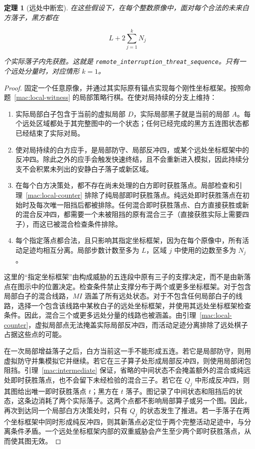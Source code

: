 \documentclass[11pt]{article}
\newtheorem{theorem}{定理}[section]
\theoremstyle{definition}
\theoremstyle{remark}
\begin{document}
\begin{theorem}[远处中断宏]\label{mac:interruption}
在这些假设下，在每个整数原像中，面对每个合法的未来白方落子，黑方都在

\[
 L+2\sum_{j=1}^kN_j
\]

个实际落子内先获胜。这就是 \texttt{remote\_interruption\_threat\_sequence}。只有一个远处分量时，对应情形 \(k=1\)。

\end{theorem}
\begin{proof}
固定一个任意原像，并通过其实际原有锚点实现每个刚性坐标框架。按照命题~\ref{mac:local-witness} 的局部策略行棋。在使对局持续的分支上维持：

\begin{enumerate}
\item 实际局部白子包含于当前的虚拟局部 \(D\)，实际局部黑子就是当前的局部 \(A\)。每个远处区域都处于其完整图中的一个状态；任何已经完成的黑方五连图状态都已经结束了实际对局。
\item 使对局持续的白方应手，是局部防守、局部反冲四，或某个远处坐标框架中的反冲四。除此之外的应手会触发快速终结，且不会重新进入模拟，因此持续分支不会积累未列出的安静白子落子或新区域。
\item 在每个白方决策处，都不存在尚未处理的白方即时获胜落点。局部检查和引理~\ref{mac:local-counter} 排除了纯局部即时获胜落点。纯远处即时获胜落点在初始时及每次唯一阻挡后都被排除。任何混合即时获胜落点、白方直接获胜或新的混合反冲四，都需要一个未被阻挡的原有混合三子（直接获胜实际上需要四子），而这已被混合检查条件排除。
\item 每个指定落点都合法，且只影响其指定坐标框架，因为在每个原像中，所有活动足迹均相互分离。局部步数计数至多为 \(L\)，区域 \(j\) 中使用的边数至多为 \(N_j\)。

\end{enumerate}
这里的``指定坐标框架''由构成威胁的五连段中原有三子的支撑决定，而不是由新落点在图示中的位置决定。检查条件禁止支撑分布于两个或更多坐标框架。对于包含局部白子的混合线路，\(MI\) 涵盖了所有远处状态。对于不包含任何局部白子的线路，选择一个包含该线路中某枚白子的远处坐标框架，并使用其远处坐标框架检查条件。因此，混合三个或更多远处分量的线路也被涵盖。由引理~\ref{mac:local-counter}，虚拟局部点无法掩盖实际局部反冲四，而活动足迹分离排除了远处棋子占据这些点的可能。

在一次局部增益落子之后，白方当前这一手不能形成五连。若它是局部防守，则用虚拟防守并集模拟它并继续。若它在三子算子处形成局部反冲四，则使用局部闭包阻挡。引理~\ref{mac:intermediate} 保证，省略的中间状态不会掩盖额外的混合或纯远处即时获胜落点，也不会留下未经检验的混合三子。若它在 \(Q_j\) 中形成反冲四，则其图给出唯一即时获胜落点 \(t\)；黑方在 \(t\) 落子。图记录了中间状态和阻挡后的状态，这条边消耗了两个实际落子。这两个点都不影响局部算子或另一个图。因此，再次到达同一个局部白方决策处时，只有 \(Q_j\) 的状态发生了推进。若一手落子在两个坐标框架中同时形成纯反冲四，则其新落点必定位于两个完整活动足迹中，与分离条件矛盾。一个远处坐标框架内部的双重威胁会产生至少两个即时获胜落点，从而使其图无效。


\end{proof}
\end{document}
